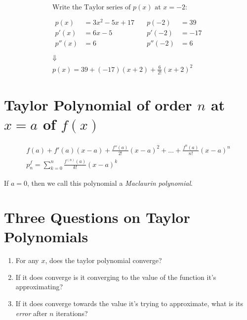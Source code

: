 \documentclass[00_complete]{subfiles}
\begin{document}
\begin{example}
$$
\begin{gathered}
    \text{Write the Taylor series of $p(x)$ at $x=-2$:} \\
    \\
    \begin{aligned}
        p(x) &= 3x^2-5x+17 \\
        p'(x) &= 6x-5 \\
        p''(x) &= 6 \\
    \end{aligned} \quad
    \begin{aligned}
        p(-2) &= 39 \\
        p'(-2) &= -17 \\
        p''(-2) &= 6 \\
    \end{aligned} \\
    \Downarrow \\
    p(x) = 39 + (-17)(x+2)+ \frac{6}{2!}(x+2)^2
\end{gathered}
$$
\end{example}

\section{Taylor Polynomial of order \texorpdfstring{$n$}{n} at
\texorpdfstring{$x=a$}{x=a} of \texorpdfstring{$f(x)$}{f(x)}}

$$
\begin{gathered}
    f(a)+ f'(a)(x-a)+ \frac{f''(a)}{2!}(x-a)^2+ \dots +
    \frac{f^{n}(a)}{n!}(x-a)^n \\
    \boxed{p^f_n = \sum_{k=0}^{n} \frac{f^{(n)}(a)}{k!}(x-a)^k}
\end{gathered}
$$
\begin{note}
    If $a=0$, then we call this polynomial a \emph{Maclaurin polynomial}.
\end{note}

\section{Three Questions on Taylor Polynomials}

\begin{enumerate}
  \item For any $x$, does the taylor polynomial converge?
  \item If it does converge is it converging to the value of the function it's
      approximating?
  \item If it does converge towards the value it's trying to approximate, what
      is its \emph{error} after $n$ iterations?
\end{enumerate}
\end{document}
